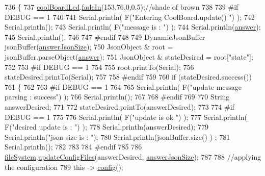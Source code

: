\begin{DoxyCode}
736 \{
737     \hyperlink{classCoolBoard_a1b1d3c684a5baa56b08486e192fd8e97}{coolBoardLed}.\hyperlink{classCoolBoardLed_ab778f5e7bed0ab74e3906d82110493c3}{fadeIn}(153,76,0,0.5);\textcolor{comment}{//shade of brown        }
738 
739 \textcolor{preprocessor}{#if DEBUG == 1}
740 
741     Serial.println( F(\textcolor{stringliteral}{"Entering CoolBoard.update() "}) );
742     Serial.println();
743     Serial.println( F(\textcolor{stringliteral}{"message is : "}) );
744     Serial.println(\hyperlink{classCoolBoard_a7b835fafd449e5282f7f91d787a2dc15}{answer});
745     Serial.println();
746 
747 \textcolor{preprocessor}{#endif}
748 
749     DynamicJsonBuffer jsonBuffer(\hyperlink{classCoolBoard_af2da1f85315b3d074a8b87d158094fb7}{answerJsonSize});
750     JsonObject & root = jsonBuffer.parseObject(\hyperlink{classCoolBoard_a7b835fafd449e5282f7f91d787a2dc15}{answer});
751     JsonObject & stateDesired = root[\textcolor{stringliteral}{"state"}];
752 
753 \textcolor{preprocessor}{#if DEBUG == 1}
754     
755     root.printTo(Serial);
756     stateDesired.printTo(Serial);
757 
758 \textcolor{preprocessor}{#endif}
759 
760     \textcolor{keywordflow}{if} (stateDesired.success())
761     \{
762     
763 \textcolor{preprocessor}{    #if DEBUG == 1}
764 
765         Serial.println( F(\textcolor{stringliteral}{"update message parsing : success"}) );
766         Serial.println();
767     
768 \textcolor{preprocessor}{    #endif}
769 
770             String answerDesired;
771         
772             stateDesired.printTo(answerDesired);
773             
774 \textcolor{preprocessor}{        #if DEBUG == 1      }
775         
776             Serial.println( F(\textcolor{stringliteral}{"update is ok "}) );
777             Serial.println( F(\textcolor{stringliteral}{"desired update is : "}) );            
778             Serial.println(answerDesired);
779             Serial.println(\textcolor{stringliteral}{"json size is : "});
780             Serial.println(jsonBuffer.size() ) ;                
781             Serial.println();
782 
783         
784 \textcolor{preprocessor}{        #endif}
785             
786             \hyperlink{classCoolBoard_a42c2586fbb13ff7f06538e9284e8538d}{fileSystem}.\hyperlink{classCoolFileSystem_a32dad79ae80182a83e2e8f52286b7c7b}{updateConfigFiles}(answerDesired, 
      \hyperlink{classCoolBoard_af2da1f85315b3d074a8b87d158094fb7}{answerJsonSize});
787 
788             \textcolor{comment}{//applying the configuration    }
789             \textcolor{keyword}{this} -> \hyperlink{classCoolBoard_a583a874c09c07e70a6eb9229fc4beddb}{config}();

\end{DoxyCode}
